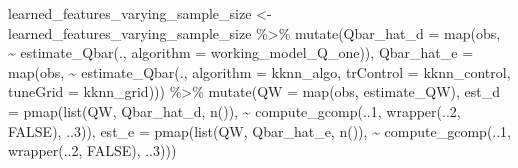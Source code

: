 \documentclass[
  11pt,
  openright,twoside]{book}
\newenvironment{Shaded}{\begin{snugshade}}{\end{snugshade}}
\newcommand{\AttributeTok}[1]{\textcolor[rgb]{0.77,0.63,0.00}{#1}}
\newcommand{\ConstantTok}[1]{\textcolor[rgb]{0.00,0.00,0.00}{#1}}
\newcommand{\DecValTok}[1]{\textcolor[rgb]{0.00,0.00,0.81}{#1}}
\newcommand{\FunctionTok}[1]{\textcolor[rgb]{0.00,0.00,0.00}{#1}}
\newcommand{\NormalTok}[1]{#1}
\newcommand{\OtherTok}[1]{\textcolor[rgb]{0.56,0.35,0.01}{#1}}
\newcommand{\SpecialCharTok}[1]{\textcolor[rgb]{0.00,0.00,0.00}{#1}}
\theoremstyle{definition}
\theoremstyle{definition}
\theoremstyle{definition}
\theoremstyle{definition}
\theoremstyle{remark}
\begin{document}
\begin{Shaded}
\begin{Highlighting}[]
\NormalTok{learned\_features\_varying\_sample\_size }\OtherTok{\textless{}{-}}
\NormalTok{  learned\_features\_varying\_sample\_size }\SpecialCharTok{\%\textgreater{}\%}
  \FunctionTok{mutate}\NormalTok{(}\AttributeTok{Qbar\_hat\_d =}
           \FunctionTok{map}\NormalTok{(obs,}
               \SpecialCharTok{\textasciitilde{}} \FunctionTok{estimate\_Qbar}\NormalTok{(., }\AttributeTok{algorithm =}\NormalTok{ working\_model\_Q\_one)),}
         \AttributeTok{Qbar\_hat\_e =}
           \FunctionTok{map}\NormalTok{(obs,}
               \SpecialCharTok{\textasciitilde{}} \FunctionTok{estimate\_Qbar}\NormalTok{(., }\AttributeTok{algorithm =}\NormalTok{ kknn\_algo,}
                               \AttributeTok{trControl =}\NormalTok{ kknn\_control,}
                               \AttributeTok{tuneGrid =}\NormalTok{ kknn\_grid))) }\SpecialCharTok{\%\textgreater{}\%}
  \FunctionTok{mutate}\NormalTok{(}\AttributeTok{QW =} \FunctionTok{map}\NormalTok{(obs, estimate\_QW),}
         \AttributeTok{est\_d =}
           \FunctionTok{pmap}\NormalTok{(}\FunctionTok{list}\NormalTok{(QW, Qbar\_hat\_d, }\FunctionTok{n}\NormalTok{()),}
                \SpecialCharTok{\textasciitilde{}} \FunctionTok{compute\_gcomp}\NormalTok{(..}\DecValTok{1}\NormalTok{, }\FunctionTok{wrapper}\NormalTok{(..}\DecValTok{2}\NormalTok{, }\ConstantTok{FALSE}\NormalTok{), ..}\DecValTok{3}\NormalTok{)),}
         \AttributeTok{est\_e =}
           \FunctionTok{pmap}\NormalTok{(}\FunctionTok{list}\NormalTok{(QW, Qbar\_hat\_e, }\FunctionTok{n}\NormalTok{()),}
                \SpecialCharTok{\textasciitilde{}} \FunctionTok{compute\_gcomp}\NormalTok{(..}\DecValTok{1}\NormalTok{, }\FunctionTok{wrapper}\NormalTok{(..}\DecValTok{2}\NormalTok{, }\ConstantTok{FALSE}\NormalTok{), ..}\DecValTok{3}\NormalTok{)))}


\end{Highlighting}
\end{Shaded}
\end{document}
